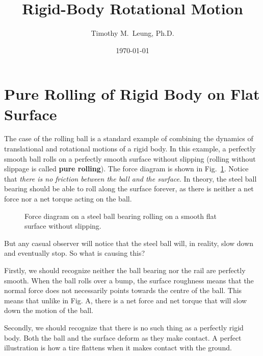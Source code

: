 \documentclass[11pt]{article}
\title{Rigid-Body Rotational Motion}
\author{Timothy M.\ Leung, Ph.D.}
\date{\today}
\newcommand{\mb}[1]{\mathbf{#1}}
\begin{document}
\maketitle

\section{Pure Rolling of Rigid Body on Flat Surface}
The case of the rolling ball is a standard example of combining the dynamics of
translational and rotational motions of a rigid body. In this example, a
perfectly smooth ball rolls on a perfectly smooth surface without slipping
(rolling without slippage is called \textbf{pure rolling}). The force diagram
is shown in Fig.~\ref{roll-flat}. Notice that \emph{there is no friction between
  the ball and the surface}. In theory, the steel ball bearing should be able
to roll along the surface forever, as there is neither a net force nor a net
torque acting on the ball.
\begin{figure}[!ht]
  \centering
  \caption{Force diagram on a steel ball bearing rolling on a smooth flat
    surface without slipping.}
  \label{roll-flat}
\end{figure}

But any casual observer will notice that the steel ball will, in reality, slow
down and eventually stop. So what is causing this?

Firstly, we should recognize neither the ball bearing nor the rail are
perfectly smooth. When the ball rolls over a bump, the surface roughness means
that the normal force does not necessarily points towards the centre of the
ball. This means that unlike in Fig. A, there is a net force and net torque
that will slow down the motion of the ball.

%
Secondly, we should recognize that there is no such thing as a perfectly rigid
body. Both the ball and the surface deform as they make contact. A perfect
illustration is how a tire flattens when it makes contact with the ground.
\end{document}
